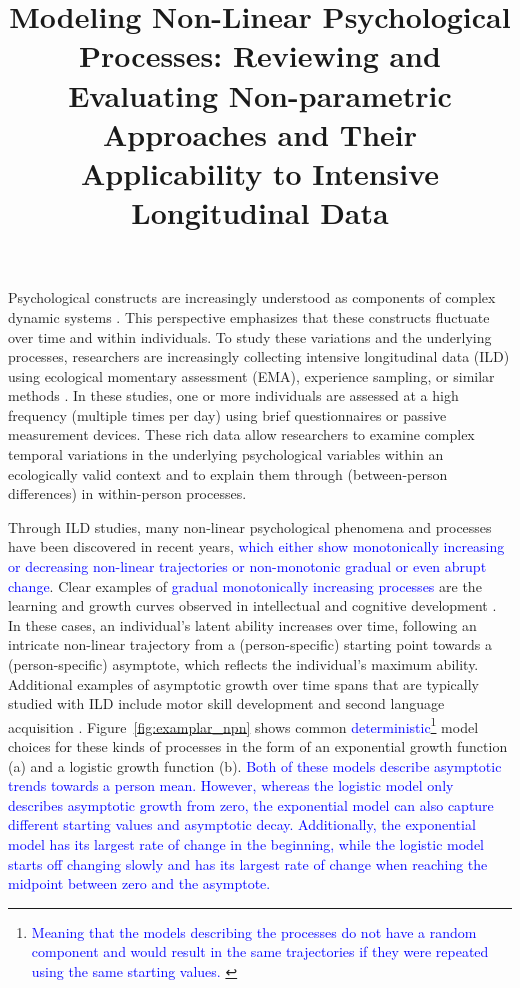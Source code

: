 \documentclass[man, floatsintext]{apa7}
\title{Modeling Non-Linear Psychological Processes: Reviewing and Evaluating
  Non-parametric Approaches and Their Applicability to Intensive
  Longitudinal Data}
\begin{document}
\maketitle

Psychological constructs are increasingly understood as components of complex
dynamic systems \parencite{nesselroade_studying_2004, wang_investigating_2012}.
This perspective emphasizes that these constructs fluctuate over time and
within individuals. To study these variations and the underlying processes,
researchers are increasingly collecting intensive longitudinal data (ILD) using
ecological momentary assessment (EMA), experience sampling, or similar methods
\parencite{fritz_so_2023}. In these studies, one or more individuals are
assessed at a high frequency (multiple times per day) using brief
questionnaires or passive measurement devices. These rich data allow
researchers to examine complex temporal variations in the underlying
psychological variables within an ecologically valid context and to explain
them through (between-person differences) in within-person processes.

Through ILD studies, many non-linear psychological phenomena and processes have
been discovered in recent years, \textcolor{blue}{which either show
  monotonically increasing or decreasing non-linear trajectories or
  non-monotonic
  gradual or even abrupt change}. Clear examples of \textcolor{blue}{ gradual
  monotonically increasing processes} are the learning and growth curves
observed
in intellectual and cognitive development \parencite{kunnen_dynamic_2012,
  mcardle_comparative_2002}. In these cases, an individual's latent ability
increases over time, following an intricate non-linear trajectory from a
(person-specific) starting point towards a (person-specific) asymptote, which
reflects the individual's maximum ability. Additional examples of asymptotic
growth over time spans that are typically studied with ILD include
motor skill development \parencite{newell_time_2001} and second language
acquisition \parencite{de_bot_dynamic_2007}. Figure~\ref{fig:examplar_npn}
shows common \textcolor{blue}{deterministic}\footnote{\textcolor{blue}{
    Meaning that the models describing the processes do not have a random
    component and would result in the same trajectories if they were repeated
    using the same starting values.
  }} model choices for these kinds of
processes in the form of an exponential growth function (a) and a logistic
growth function (b). \textcolor{blue}{Both of these models describe asymptotic
  trends towards a person mean. However, whereas the logistic model only
  describes asymptotic growth from zero, the exponential model can also capture
  different starting values and asymptotic decay. Additionally, the exponential
  model has its largest rate of change in the beginning, while the logistic
  model
  starts off changing slowly and has its largest rate of change when reaching
  the
  midpoint between zero and the asymptote.}
\end{document}
